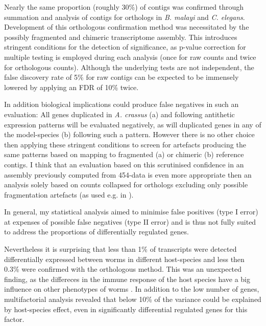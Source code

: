 Nearly the same proportion (roughly 30\%) of contigs was confirmed
through summation and analysis of contigs for orthologs in
\textit{B. malayi} and \textit{C. elegans}. Development of this
orthologous confirmation method was necessitated by the possibly
fragmented and chimeric transcriptome assembly. This introduces
stringent conditions for the detection of significance, as p-value
correction for multiple testing is employed during each analysis (once
for raw counts and twice for orthologous counts). Although the
underlying tests are not independent, the false discovery rate of 5\%
for raw contigs can be expected to be immensely lowered by applying an
FDR of 10\% twice.

In addition biological implications could produce false negatives in
such an evaluation: All genes duplicated in \textit{A. crassus} (a)
and following antithetic expression patterns will be evaluated
negatively, as will duplicated genes in any of the model-species (b)
following such a pattern. However there is no other choice then
applying these stringent conditions to screen for artefacts producing
the same patterns based on mapping to fragmented (a) or chimeric (b)
reference contigs. I think that an evaluation based on this
scrutinised confidence in an assembly previously computed from
454-data is even more appropriate then an analysis solely based on
counts collapsed for orthologs excluding only possible fragmentation
artefacts (as used e.g. in \cite{pmid22084086}).

In general, my statistical analysis aimed to minimise false positives
(type I error) at expenses of possible false negatives (type II error)
and is thus not fully suited to address the proportions of
differentially regulated genes.

Nevertheless it is surprising that less than 1\% of transcripts were
detected differentially expressed between worms in different
host-species and less then 0.3\% were confirmed with the orthologous
method. This was an unexpected finding, as the differeces in the
immune response of the host species have a big influence on other
phenotypes of worms \cite{knopf_swimbladder_2006}. In addition to the
low number of genes, multifactorial analysis revealed that below 10\%
of the variance could be explained by host-species effect, even in
significantly differential regulated genes for this factor.

